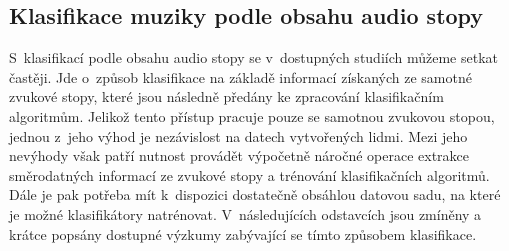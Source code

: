 

\subsection*{Klasifikace muziky podle obsahu audio stopy}
\label{klasifikace_muziky_podle_obsahu_audio_stopy}
S~klasifikací podle obsahu audio stopy se v~dostupných studiích můžeme setkat častěji. Jde o~způsob klasifikace na základě informací získaných ze samotné zvukové stopy, které jsou následně předány ke zpracování klasifikačním algoritmům. Jelikož tento přístup pracuje pouze se samotnou zvukovou stopou, jednou z~jeho výhod je nezávislost na datech vytvořených lidmi. Mezi jeho nevýhody však patří nutnost provádět výpočetně náročné operace extrakce směrodatných informací ze zvukové stopy a trénování klasifikačních algoritmů. Dále je pak potřeba mít k~dispozici dostatečně obsáhlou datovou sadu, na které je možné klasifikátory natrénovat. V~následujících odstavcích jsou zmíněny a krátce popsány dostupné výzkumy zabývající se tímto způsobem klasifikace.

